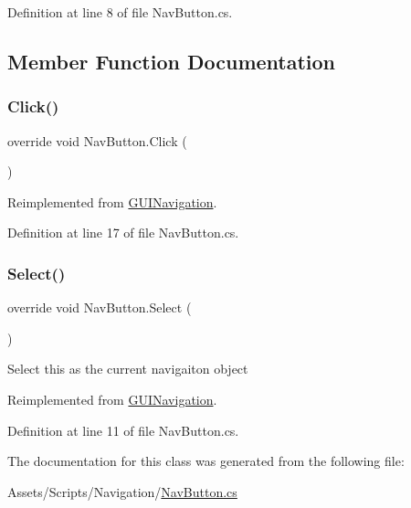 Definition at line 8 of file Nav\+Button.\+cs.



\subsection{Member Function Documentation}
\mbox{\label{class_nav_button_ac574ba6c7acafe3ccd18b2c62b8c261d}} 
\subsubsection{\texorpdfstring{Click()}{Click()}}
{\footnotesize\ttfamily override void Nav\+Button.\+Click (\begin{DoxyParamCaption}{ }\end{DoxyParamCaption})\hspace{0.3cm}{\ttfamily [virtual]}}



Reimplemented from \mbox{\hyperlink{class_g_u_i_navigation_a175178a8bf2832e74c13f83bf8e8f714}{G\+U\+I\+Navigation}}.



Definition at line 17 of file Nav\+Button.\+cs.

\mbox{\label{class_nav_button_ac6d38f6d6b51c27c7b6a67d9efcfcb8e}} 
\subsubsection{\texorpdfstring{Select()}{Select()}}
{\footnotesize\ttfamily override void Nav\+Button.\+Select (\begin{DoxyParamCaption}{ }\end{DoxyParamCaption})\hspace{0.3cm}{\ttfamily [virtual]}}



Select this as the current navigaiton object 



Reimplemented from \mbox{\hyperlink{class_g_u_i_navigation_a4c40fc7986ac35247bc8f77c615e7847}{G\+U\+I\+Navigation}}.



Definition at line 11 of file Nav\+Button.\+cs.



The documentation for this class was generated from the following file\+:\begin{DoxyCompactItemize}
\item 
Assets/\+Scripts/\+Navigation/\mbox{\hyperlink{_nav_button_8cs}{Nav\+Button.\+cs}}\end{DoxyCompactItemize}
